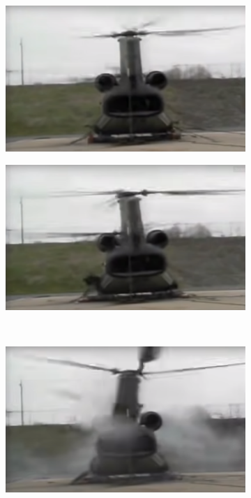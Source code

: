 \begin{figure}[H]
	\centering
	\begin{subfigure}{0.4\textwidth}
		\centering
		\includegraphics[width=\linewidth]{gambar/gr_1.png}
		\caption{}
		\label{fig:gr_1}
	\end{subfigure}
	\centering
	\begin{subfigure}{0.4\textwidth}
		\centering
		\includegraphics[width=\linewidth]{gambar/gr_2.png}
		\caption{}
		\label{fig:gr_2}
	\end{subfigure}
\\
	\centering
	\begin{subfigure}{0.4\textwidth}
		\centering
		\includegraphics[width=\linewidth]{gambar/gr_3.png}

\end{subfigure}
\end{figure}
